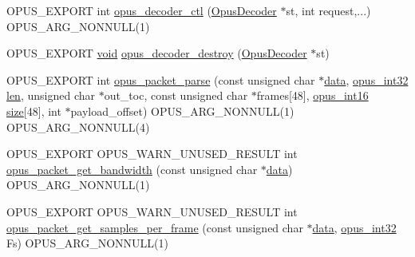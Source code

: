 \begin{DoxyCompactItemize}
\item 
O\+P\+U\+S\+\_\+\+E\+X\+P\+O\+RT int \mbox{\hyperlink{group__opus__decoder_gae70051dd19b78e25241bb6ca9a222f12}{opus\+\_\+decoder\+\_\+ctl}} (\mbox{\hyperlink{group__opus__decoder_ga401d8579958d36094715a6b90cd159a6}{Opus\+Decoder}} $\ast$st, int request,...) O\+P\+U\+S\+\_\+\+A\+R\+G\+\_\+\+N\+O\+N\+N\+U\+LL(1)
\item 
O\+P\+U\+S\+\_\+\+E\+X\+P\+O\+RT \mbox{\hyperlink{_s_d_l__opengles2__gl2ext_8h_ae5d8fa23ad07c48bb609509eae494c95}{void}} \mbox{\hyperlink{group__opus__decoder_gae8cba5f0f579a37e09b5fdc6267bf8ed}{opus\+\_\+decoder\+\_\+destroy}} (\mbox{\hyperlink{group__opus__decoder_ga401d8579958d36094715a6b90cd159a6}{Opus\+Decoder}} $\ast$st)
\item 
O\+P\+U\+S\+\_\+\+E\+X\+P\+O\+RT int \mbox{\hyperlink{group__opus__decoder_gaa48fa0479919163df306d13a6aa58546}{opus\+\_\+packet\+\_\+parse}} (const unsigned char $\ast$\mbox{\hyperlink{_s_d_l__opengl_8h_a2e335d56e2846b0fea47eed068b2d34a}{data}}, \mbox{\hyperlink{opus__types_8h_aa4d309d6f80b99dbabebc8f98879ab9a}{opus\+\_\+int32}} \mbox{\hyperlink{_s_d_l__opengl__glext_8h_a652168017ea9a8bbcead03d5c16269fb}{len}}, unsigned char $\ast$out\+\_\+toc, const unsigned char $\ast$frames\mbox{[}48\mbox{]}, \mbox{\hyperlink{opus__types_8h_acc9ed7cf60479eb81f9648c6ec27dc26}{opus\+\_\+int16}} \mbox{\hyperlink{_s_d_l__opengl__glext_8h_a3d1e3edfcf61ca2d831883e1afbad89e}{size}}\mbox{[}48\mbox{]}, int $\ast$payload\+\_\+offset) O\+P\+U\+S\+\_\+\+A\+R\+G\+\_\+\+N\+O\+N\+N\+U\+LL(1) O\+P\+U\+S\+\_\+\+A\+R\+G\+\_\+\+N\+O\+N\+N\+U\+LL(4)
\item 
O\+P\+U\+S\+\_\+\+E\+X\+P\+O\+RT O\+P\+U\+S\+\_\+\+W\+A\+R\+N\+\_\+\+U\+N\+U\+S\+E\+D\+\_\+\+R\+E\+S\+U\+LT int \mbox{\hyperlink{group__opus__decoder_ga01a86c22c369f60a458443b397b710d8}{opus\+\_\+packet\+\_\+get\+\_\+bandwidth}} (const unsigned char $\ast$\mbox{\hyperlink{_s_d_l__opengl_8h_a2e335d56e2846b0fea47eed068b2d34a}{data}}) O\+P\+U\+S\+\_\+\+A\+R\+G\+\_\+\+N\+O\+N\+N\+U\+LL(1)
\item 
O\+P\+U\+S\+\_\+\+E\+X\+P\+O\+RT O\+P\+U\+S\+\_\+\+W\+A\+R\+N\+\_\+\+U\+N\+U\+S\+E\+D\+\_\+\+R\+E\+S\+U\+LT int \mbox{\hyperlink{group__opus__decoder_ga885564fa670e308100dfda89d3cdea10}{opus\+\_\+packet\+\_\+get\+\_\+samples\+\_\+per\+\_\+frame}} (const unsigned char $\ast$\mbox{\hyperlink{_s_d_l__opengl_8h_a2e335d56e2846b0fea47eed068b2d34a}{data}}, \mbox{\hyperlink{opus__types_8h_aa4d309d6f80b99dbabebc8f98879ab9a}{opus\+\_\+int32}} Fs) O\+P\+U\+S\+\_\+\+A\+R\+G\+\_\+\+N\+O\+N\+N\+U\+LL(1)
\item 

\end{DoxyCompactItemize}
